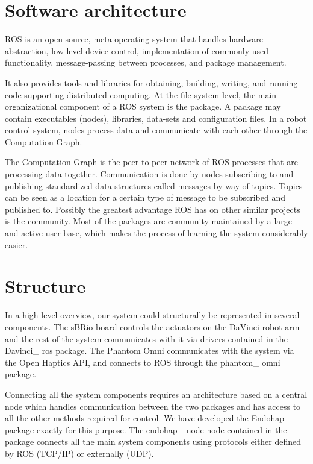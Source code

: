\section{Software architecture}
ROS is an open-source, meta-operating system that handles
hardware abstraction, low-level device control, implementation
of commonly-used functionality, message-passing between
processes, and package management.

 It also provides tools and libraries for obtaining, building, writing, and running code supporting distributed computing. At the file system level, the main organizational component of a ROS system
is the package. A package may contain executables (nodes),
libraries, data-sets and configuration files. In a robot control
system, nodes process data and communicate with each other
through the Computation Graph.

The Computation Graph is the peer-to-peer network of ROS
processes that are processing data together. Communication
is done by nodes subscribing to and publishing standardized
data structures called messages by way of topics. Topics can
be seen as a location for a certain type of message to be
subscribed and published to. Possibly the greatest advantage
ROS has on other similar projects is the community. Most of
the packages are community maintained by a large and active
user base, which makes the process of learning the system
considerably easier.

\section*{Structure}

In a high level overview, our system could structurally be represented in several components.
The sBRio board controls the actuators on the DaVinci robot arm and the rest of the system communicates with it via drivers contained in the Davinci\_ ros package. The Phantom Omni communicates with the system via the Open Haptics API, and connects to ROS through the phantom\_ omni package.

Connecting all the system components requires an architecture based on a central node which handles communication between the two packages and has access to all the other methods required for control.
We have developed the Endohap package exactly for this purpose.
The endohap\_ node node contained in the package connects all the main system components using protocols either defined by ROS (TCP/IP) or externally (UDP). 

